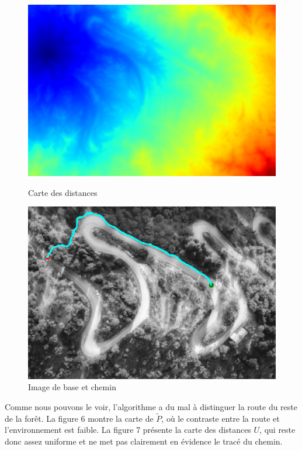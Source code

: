 \documentclass{article}
\begin{document}
\begin{figure}[h!]
\begin{minipage}{0.24\textwidth}
        \includegraphics[width=\linewidth]{result_image/Image_4/3.png}
        \caption*{\small Carte des distances}
    \end{minipage}\hfill
    \begin{minipage}{0.24\textwidth}
        \centering
        \includegraphics[width=\linewidth]{result_image/Image_4/4.png}
        \caption*{\small Image de base et chemin}
    \end{minipage}
    \label{fig:images-tests}
\end{figure}

Comme nous pouvons le voir, l'algorithme a du mal à distinguer la route du reste de la forêt. 
La figure 6 montre la carte de $\tilde{P}$, où le contraste entre la route et l'environnement 
est faible. La figure 7 présente la carte des distances $U$, qui reste donc assez uniforme 
et ne met pas clairement en évidence le tracé du chemin.
\end{document}

